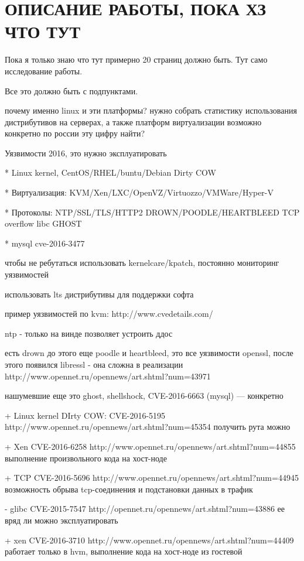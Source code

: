 \section{ОПИСАНИЕ РАБОТЫ, ПОКА ХЗ ЧТО ТУТ}

Пока я только знаю что тут примерно 20 страниц должно быть. Тут само исследование работы.

Все это должно быть с подпунктами.

почему именно linux и эти платформы?
нужно собрать статистику использования дистрибутивов на серверах, а также платформ виртуализации
возможно конкретно по россии эту цифру найти?

Уязвимости 2016, это нужно эксплуатировать

* Linux kernel, CentOS/RHEL/buntu/Debian Dirty COW

* Виртуализация: KVM/Xen/LXC/OpenVZ/Virtuozzo/VMWare/Hyper-V

* Протоколы: NTP/SSL/TLS/HTTP2 DROWN/POODLE/HEARTBLEED TCP overflow libc GHOST

* mysql cve-2016-3477

чтобы не ребутаться использовать kernelcare/kpatch, постоянно мониторинг уязвимостей

использовать lts дистрибутивы для поддержки софта

пример уязвимостей по kvm: http://www.cvedetails.com/

ntp - только на винде позволяет устроить ддос

есть drown до этого еще poodle и heartbleed, это все уязвимости openssl, после этого появился libressl - она сложна в реализации http://www.opennet.ru/opennews/art.shtml?num=43971

нашумевшие еще это ghost, shellshock, CVE-2016-6663 (mysql)
--- конкретно

+ Linux kernel DIrty COW: CVE-2016-5195 http://www.opennet.ru/opennews/art.shtml?num=45354
получить рута можно

+ Xen CVE-2016-6258 http://www.opennet.ru/opennews/art.shtml?num=44855
выполнение произвольного кода на хост-ноде

+ TCP CVE-2016-5696 http://www.opennet.ru/opennews/art.shtml?num=44945
возможность обрыва tcp-соединения и подстановки данных в трафик

- glibc CVE-2015-7547 http://opennet.ru/opennews/art.shtml?num=43886
ее вряд ли можно эксплуатировать

+ xen CVE-2016-3710 http://www.opennet.ru/opennews/art.shtml?num=44409
работает только в hvm, выполнение кода на хост-ноде из гостевой

